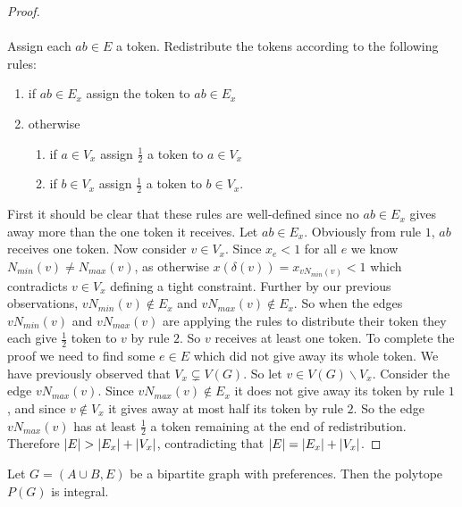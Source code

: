 \begin{proof}
\paragraph{}
Assign each $ab \in E$ a token. Redistribute the tokens according to the following rules:
\begin{enumerate}
\item if $ab \in E_x$ assign the token to $ab \in E_x$
\item otherwise
\begin{enumerate}
\item if $a \in V_x$ assign $\frac{1}{2}$ a token to $a \in V_x$
\item if $b \in V_x$ assign $\frac{1}{2}$ a token to $b \in V_x$.
\end{enumerate}
\end{enumerate}
First it should be clear that these rules are well-defined since no $ab \in E_x$ gives away more than the one token it receives. Let $ab \in E_x$. Obviously from rule $1$, $ab$ receives one token. Now consider $v \in V_x$. Since $x_e<1$ for all $e$ we know $N_{min}(v) \neq N_{max}(v)$, as otherwise $x(\delta(v)) = x_{vN_{min}(v)} < 1$ which contradicts $v \in V_x$ defining a tight constraint. Further by our previous observations, $vN_{min}(v) \not\in E_x$ and $vN_{max}(v) \not\in E_x$. So when the edges $vN_{min}(v)$ and $vN_{max}(v)$ are applying the rules to distribute their token they each give $\frac{1}{2}$ token to $v$ by rule $2$. So $v$ receives at least one token. To complete the proof we need to find some $e \in E$ which did not give away its whole token. We have previously observed that $V_x \subsetneq V(G)$. So let $v \in V(G)\backslash V_x$. Consider the edge $vN_{max}(v)$. Since $vN_{max}(v) \not\in E_x$ it does not give away its token by rule $1$, and since $v \not\in V_x$ it gives away at most half its token by rule $2$. So the edge $vN_{max}(v)$ has at least $\frac{1}{2}$ a token remaining at the end of redistribution. Therefore $\left|E\right| > \left|E_x\right| + \left|V_x\right|$, contradicting that $\left|E\right| = \left|E_x\right| + \left|V_x\right|$.
\end{proof}
\begin{theorem}
Let $G=(A\cup B, E)$ be a bipartite graph with preferences. Then the polytope $P(G)$ is integral.
\end{theorem}
